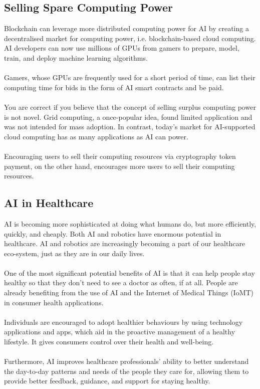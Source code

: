 \documentclass[12pt,letterpaper]{article}
\begin{document}
\pagebreak


    \subsection* {Selling Spare Computing Power}
    Blockchain can leverage more distributed computing power for AI by creating a decentralised market for computing power, i.e. blockchain-based cloud computing. AI developers can now use millions of GPUs from gamers to prepare, model, train, and deploy machine learning algorithms.
    \\
    \\
    Gamers, whose GPUs are frequently used for a short period of time, can list their computing time for bids in the form of AI smart contracts and be paid.
    \\
    \\
    You are correct if you believe that the concept of selling surplus computing power is not novel. Grid computing, a once-popular idea, found limited application and was not intended for mass adoption. In contrast, today's market for AI-supported cloud computing has as many applications as AI can power. 
    \\
    \\
    Encouraging users to sell their computing resources via cryptography token payment, on the other hand, encourages more users to sell their computing resources.

\pagebreak

\subsection* {AI in Healthcare}
    AI is becoming more sophisticated at doing what humans do, but more efficiently, quickly, and cheaply. Both AI and robotics have enormous potential in healthcare. AI and robotics are increasingly becoming a part of our healthcare eco-system, just as they are in our daily lives.
\\
\\
One of the most significant potential benefits of AI is that it can help people stay healthy so that they don't need to see a doctor as often, if at all. People are already benefiting from the use of AI and the Internet of Medical Things (IoMT) in consumer health applications.
\\
\\
Individuals are encouraged to adopt healthier behaviours by using technology applications and apps, which aid in the proactive management of a healthy lifestyle. It gives consumers control over their health and well-being.
\\
\\
Furthermore, AI improves healthcare professionals' ability to better understand the day-to-day patterns and needs of the people they care for, allowing them to provide better feedback, guidance, and support for staying healthy.
\end{document}
